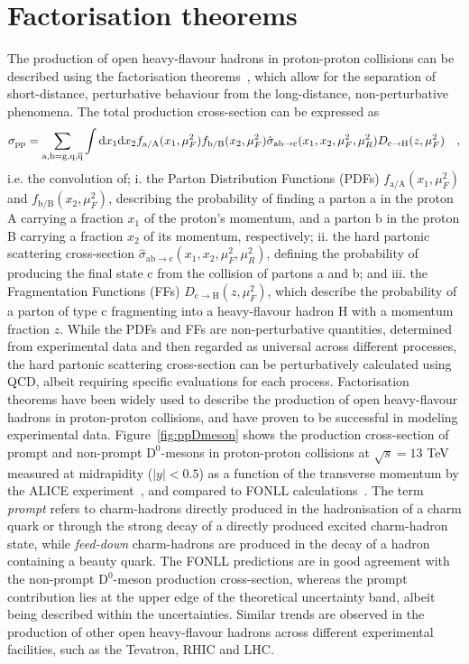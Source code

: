 \section{Factorisation theorems}
The production of open heavy-flavour hadrons in proton-proton collisions can be described using the factorisation theorems~\cite{Collins:1989gx}, which allow for the separation of short-distance, perturbative behaviour from the long-distance, non-perturbative phenomena. The total production cross-section can be expressed as
\begin{equation*}
    \sigma_{\text{pp}} = \sum_\mathrm{a,b = g, q, \overline{q}} \int \mathrm{d} x_1 \mathrm{d} x_2 f_\mathrm{a/A}(x_1,\mu_F^2) f_\mathrm{b/B}(x_2,\mu_F^2) \hat{\sigma}_\mathrm{ab \rightarrow c} (x_1,x_2,\mu_F^2,\mu_R^2) D_\mathrm{c\rightarrow H}(z,\mu_F^2) \quad ,
\end{equation*}
i.e. the convolution of; i. the Parton Distribution Functions (PDFs) $f_\mathrm{a/A}(x_1,\mu_F^2)$ and $f_\mathrm{b/B}(x_2,\mu_F^2)$, describing the probability of finding a parton a in the proton A carrying a fraction $x_1$ of the proton's momentum, and a parton b in the proton B carrying a fraction $x_2$ of its momentum, respectively; ii. the hard partonic scattering cross-section $\hat{\sigma}_\mathrm{ab \rightarrow c} (x_1,x_2,\mu_F^2,\mu_R^2)$, defining the probability of producing the final state c from the collision of partons a and b; and iii. the Fragmentation Functions (FFs) $D_\mathrm{c\rightarrow H}(z,\mu_F^2)$, which describe the probability of a parton of type c fragmenting into a heavy-flavour hadron H with a momentum fraction $z$. While the PDFs and FFs are non-perturbative quantities, determined from experimental data and then regarded as universal across different processes, the hard partonic scattering cross-section can be perturbatively calculated using QCD, albeit requiring specific evaluations for each process. Factorisation theorems have been widely used to describe the production of open heavy-flavour hadrons in proton-proton collisions, and have proven to be successful in modeling experimental data. Figure~\ref{fig:ppDmeson} shows the production cross-section of prompt and non-prompt $\mathrm{D^0}$-mesons in proton-proton collisions at $\sqrt{s} = 13$ TeV measured at midrapidity ($\lvert y\rvert<0.5$) as a function of the transverse momentum \pt by the ALICE experiment~\cite{ALICE:2021mgk}, and compared to FONLL calculations~\cite{Cacciari:2001td}. The term \emph{prompt} refers to charm-hadrons directly produced in the hadronisation of a charm quark or through the strong decay of a directly produced excited charm-hadron state, while \emph{feed-down} charm-hadrons are produced in the decay of a hadron containing a beauty quark. The FONLL predictions are in good agreement with the non-prompt $\mathrm{D^0}$-meson production cross-section, whereas the prompt contribution lies at the upper edge of the theoretical uncertainty band, albeit being described within the uncertainties.  Similar trends are observed in the production of other open heavy-flavour hadrons across different experimental facilities, such as the Tevatron, RHIC and LHC.

